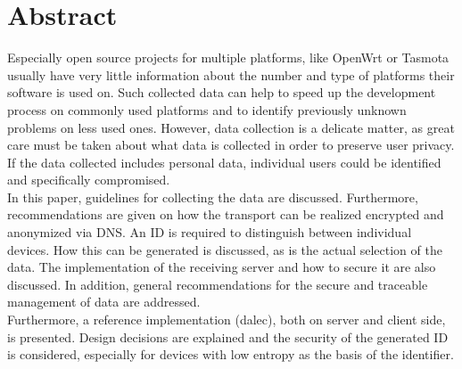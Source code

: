 \chapter*{Abstract}
\label{chap:abstract}

%
Especially open source projects for multiple platforms, like OpenWrt or Tasmota usually have very little information about the number and type of platforms their software is used on. Such collected data can help to speed up the development process on commonly used platforms and to identify previously unknown problems on less used ones. However, data collection is a delicate matter, as great care must be taken about what data is collected in order to preserve user privacy. If the data collected includes personal data, individual users could be identified and specifically compromised.\\

In this paper, guidelines for collecting the data are discussed. Furthermore, recommendations are given on how the transport can be realized encrypted and anonymized via DNS. An ID is required to distinguish between individual devices. How this can be generated is discussed, as is the actual selection of the data. The implementation of the receiving server and how to secure it are also discussed. In addition, general recommendations for the secure and traceable management of data are addressed.\\

Furthermore, a reference implementation (dalec), both on server and client side, is presented. Design decisions are explained and the security of the generated ID is considered, especially for devices with low entropy as the basis of the identifier.